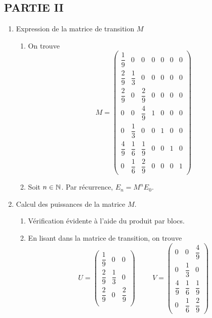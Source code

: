 \subsection*{PARTIE II}
\begin{enumerate}

\item  Expression de la matrice de transition $M$
\begin{enumerate}
\item  On trouve
\begin{displaymath}
\renewcommand{\arraystretch}{2}
M=
\begin{pmatrix}
\dfrac19&0&0&0&0&0&0\\
\dfrac 29&\dfrac 13&0&0&0&0&0\\
\dfrac29&0&\dfrac29&0&0&0&0\\
0&0&\dfrac49&1&0&0&0\\
0&\dfrac 13& 0&0&1&0&0\\
\dfrac 49&\dfrac 16&\dfrac 19&0&0&1&0\\
0&\dfrac16&\dfrac29&0&0&0&1
\end{pmatrix}  
\end{displaymath}

\item Soit $n\in\mathbb{N}$. Par récurrence, $E_n=M^nE_0$. 
\end{enumerate}

\item  Calcul des puissances de la matrice $M$.

\begin{enumerate}
\item Vérification évidente à l'aide du produit par blocs.
\item En lisant dans la matrice de transition, on trouve
\begin{displaymath}
\renewcommand{\arraystretch}{2}
U= 
\begin{pmatrix}
\dfrac19  & 0        & 0\\
\dfrac 29 & \dfrac 13 & 0\\
\dfrac29  & 0        &\dfrac29\\    
\end{pmatrix}
\hspace{1cm}
V=
\begin{pmatrix}
0&0&\dfrac49\\
0&\dfrac 13& 0\\
\dfrac 49&\dfrac 16&\dfrac 19\\
0&\dfrac16&\dfrac29
\end{pmatrix}
\end{displaymath}


\end{enumerate}
\end{enumerate}
